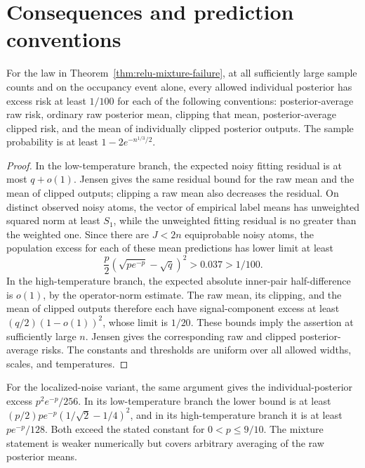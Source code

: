 \section{Consequences and prediction conventions}

\begin{corollary}
For the law in Theorem~\ref{thm:relu-mixture-failure}, at all
sufficiently large sample counts and on the occupancy event alone,
every allowed individual posterior has excess risk at least $1/100$
for each of the following conventions: posterior-average raw risk,
ordinary raw posterior mean, clipping that mean, posterior-average
clipped risk, and the mean of individually clipped posterior outputs.
The sample probability is at least $1-2e^{-n^{1/3}/2}$.
\end{corollary}
\begin{proof}
In the low-temperature branch, the expected noisy fitting residual
is at most $q+o(1)$. Jensen gives the same residual bound for the
raw mean and the mean of clipped outputs; clipping a raw mean also
decreases the residual. On distinct observed noisy atoms, the vector
of empirical label means has unweighted squared norm at least $S_1$,
while the unweighted fitting residual is no greater than the weighted
one. Since there are $J<2n$ equiprobable noisy atoms, the population
excess for each of these mean predictions has lower limit at least
\[
 \frac p2(\sqrt{pe^{-p}}-\sqrt q)^2>0.037>1/100.
\]
In the high-temperature branch, the expected absolute inner-pair
half-difference is $o(1)$, by the operator-norm estimate. The raw
mean, its clipping, and the mean of clipped outputs therefore each
have signal-component excess at least $(q/2)(1-o(1))^2$, whose limit
is $1/20$. These bounds imply the assertion at sufficiently large
$n$. Jensen gives the corresponding raw and clipped posterior-average
risks. The constants and thresholds are uniform over all allowed
widths, scales, and temperatures.
\end{proof}

For the localized-noise variant, the same argument gives the
individual-posterior excess $p^2e^{-p}/256$. In its low-temperature
branch the lower bound is at least
$(p/2)pe^{-p}(1/\sqrt2-1/4)^2$, and in its high-temperature branch it
is at least $pe^{-p}/128$. Both exceed the stated constant for
$0<p\le9/10$. The mixture statement is weaker numerically but covers
arbitrary averaging of the raw posterior means.

